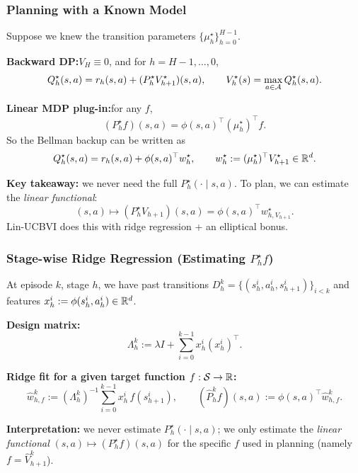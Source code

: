 \documentclass[aspectratio=169]{beamer}
\begin{document}
\begin{frame}\frametitle{Planning with a Known Model}

\small
Suppose we knew the transition parameters $\{\mu_h^\star\}_{h=0}^{H-1}$.

\vspace{0.15cm}
\textbf{Backward DP:}\quad $ V_H \equiv 0$, and for $h=H-1,\dots,0$,
\[
Q_h^\star(s,a)=r_h(s,a)+(P_h^\star V_{h+1}^\star)(s,a),
\qquad
V_h^\star(s)=\max_{a\in\mathcal{A}} Q_h^\star(s,a).
\]

\vspace{0.15cm}
\pause
\textbf{Linear MDP plug-in:}\quad for any $f$,
\[
(P_h^\star f)(s,a)=\phi(s,a)^\top(\mu_h^\star)^\top f.
\]
So the Bellman backup can be written as
\[
Q_h^\star(s,a)=r_h(s,a)+\phi(s,a)^\top w_h^\star,
\qquad
w_h^\star := (\mu_h^\star)^\top V_{h+1}^\star \in \mathbb{R}^d.
\]

\vspace{0.15cm}
\pause
\textbf{Key takeaway:} we never need the full $P_h^\star(\cdot\mid s,a)$.
To plan, we can estimate the \emph{linear functional}:
\[
(s,a)\mapsto (P_h^\star V_{h+1})(s,a)=\phi(s,a)^\top w_{h,V_{h+1}}^\star.
\]
Lin-UCBVI does this with ridge regression + an elliptical bonus.

\end{frame}

\begin{frame}\frametitle{Stage-wise Ridge Regression (Estimating $P_h^\star f$)}

\small
At episode $k$, stage $h$, we have past transitions
$D_h^k=\{(s_h^i,a_h^i,s_{h+1}^i)\}_{i<k}$ and features $x_h^i:=\phi(s_h^i,a_h^i)\in\mathbb{R}^d$.

\vspace{0.10cm}
\textbf{Design matrix:}\;
\[
\Lambda_h^k := \lambda I + \sum_{i=0}^{k-1} x_h^i(x_h^i)^\top.
\]

\vspace{0.10cm}
\textbf{Ridge fit for a given target function $f:\mathcal{S}\to\mathbb{R}$:}\;
\[
\widehat w_{h,f}^k := (\Lambda_h^k)^{-1}\sum_{i=0}^{k-1} x_h^i\, f(s_{h+1}^i),
\qquad
(\widehat P_h^k f)(s,a):=\phi(s,a)^\top \widehat w_{h,f}^k.
\]

\vspace{0.10cm}
\pause
\textbf{Interpretation:}
we never estimate $P_h^\star(\cdot\mid s,a)$; we only estimate the \emph{linear functional}
$(s,a)\mapsto (P_h^\star f)(s,a)$ for the specific $f$ used in planning (namely $f=\widehat V_{h+1}^k$).

\end{frame}
\end{document}
